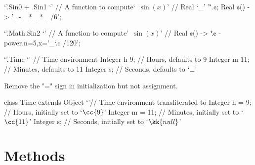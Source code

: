 \begin{reap}
  `'.Sin0 + .Sin1 {`' // A function to compute`~$\sin(x)$' //
    Real `\_' '\^'.¢;
    Real ¢() -> '\_- \_*\_ * \_/6';
  }
\end{reap}
\begin{reap}
  `'.Math.Sin2 {`' // A function to compute'~$\sin(x)$' //
    Real ¢() -> `\^.¢ - power.n=5,x='\_`.¢ /120';
  }
\end{reap}
\begin{reap}
  `'.Time {`' // Time environment
    Integer h 9; // Hours, defaults to 9
    Integer m 11; // Minutes, defaults to 11
    Integer s; // Seconds, defaults to `$⊥$'
  }
\end{reap}
Remove the "=" sign in initialization but not assignment.
\begin{java}
  class Time extends Object {`'// Time environment transliterated to \Java
    Integer h = 9; // Hours, initially set to `$\cc{9}$'
    Integer m = 11; // Minutes, initially set to `$\cc{11}$'
    Integer s; // Seconds, initially set to `$\kk{null}$'
  }
\end{java}

\section{Methods}

